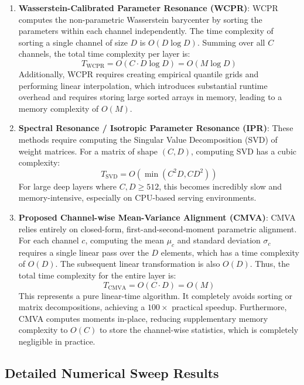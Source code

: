 \documentclass{article}
\theoremstyle{plain}
\theoremstyle{definition}
\theoremstyle{remark}
\begin{document}
\begin{enumerate}
  \item \textbf{Wasserstein-Calibrated Parameter Resonance (WCPR)}:
  WCPR computes the non-parametric Wasserstein barycenter by sorting the parameters within each channel independently. The time complexity of sorting a single channel of size $D$ is $O(D \log D)$. Summing over all $C$ channels, the total time complexity per layer is:
  \begin{equation}
    T_{\text{WCPR}} = O(C \cdot D \log D) = O(M \log D)
  \end{equation}
  Additionally, WCPR requires creating empirical quantile grids and performing linear interpolation, which introduces substantial runtime overhead and requires storing large sorted arrays in memory, leading to a memory complexity of $O(M)$.
  
  \item \textbf{Spectral Resonance / Isotropic Parameter Resonance (IPR)}:
  These methods require computing the Singular Value Decomposition (SVD) of weight matrices. For a matrix of shape $(C, D)$, computing SVD has a cubic complexity:
  \begin{equation}
    T_{\text{SVD}} = O(\min(C^2 D, C D^2))
  \end{equation}
  For large deep layers where $C, D \ge 512$, this becomes incredibly slow and memory-intensive, especially on CPU-based serving environments.
  
  \item \textbf{Proposed Channel-wise Mean-Variance Alignment (CMVA)}:
  CMVA relies entirely on closed-form, first-and-second-moment parametric alignment. For each channel $c$, computing the mean $\mu_{c}$ and standard deviation $\sigma_{c}$ requires a single linear pass over the $D$ elements, which has a time complexity of $O(D)$. The subsequent linear transformation is also $O(D)$. Thus, the total time complexity for the entire layer is:
  \begin{equation}
    T_{\text{CMVA}} = O(C \cdot D) = O(M)
  \end{equation}
  This represents a pure linear-time algorithm. It completely avoids sorting or matrix decompositions, achieving a $100\times$ practical speedup. Furthermore, CMVA computes moments in-place, reducing supplementary memory complexity to $O(C)$ to store the channel-wise statistics, which is completely negligible in practice.
\end{enumerate}

\subsection{Detailed Numerical Sweep Results}
\label{app:sweeps}
\end{document}
